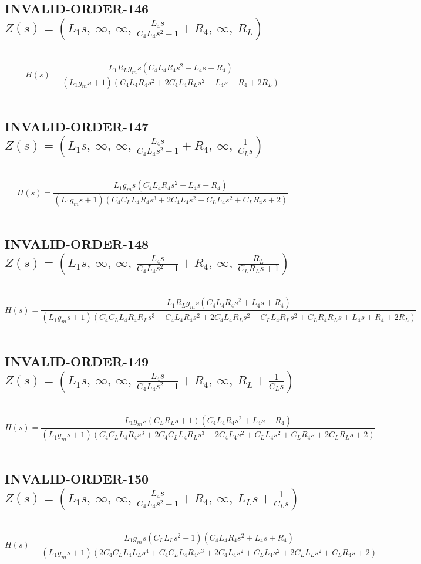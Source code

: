 \documentclass{article}
\begin{document}
\subsection{INVALID-ORDER-146 $Z(s) = \left( L_{1} s, \  \infty, \  \infty, \  \frac{L_{4} s}{C_{4} L_{4} s^{2} + 1} + R_{4}, \  \infty, \  R_{L}\right)$ } \ 
\textbf{\[H(s) = \frac{L_{1} R_{L} g_{m} s \left(C_{4} L_{4} R_{4} s^{2} + L_{4} s + R_{4}\right)}{\left(L_{1} g_{m} s + 1\right) \left(C_{4} L_{4} R_{4} s^{2} + 2 C_{4} L_{4} R_{L} s^{2} + L_{4} s + R_{4} + 2 R_{L}\right)}\] } \ 
\subsection{INVALID-ORDER-147 $Z(s) = \left( L_{1} s, \  \infty, \  \infty, \  \frac{L_{4} s}{C_{4} L_{4} s^{2} + 1} + R_{4}, \  \infty, \  \frac{1}{C_{L} s}\right)$ } \ 
\textbf{\[H(s) = \frac{L_{1} g_{m} s \left(C_{4} L_{4} R_{4} s^{2} + L_{4} s + R_{4}\right)}{\left(L_{1} g_{m} s + 1\right) \left(C_{4} C_{L} L_{4} R_{4} s^{3} + 2 C_{4} L_{4} s^{2} + C_{L} L_{4} s^{2} + C_{L} R_{4} s + 2\right)}\] } \ 
\subsection{INVALID-ORDER-148 $Z(s) = \left( L_{1} s, \  \infty, \  \infty, \  \frac{L_{4} s}{C_{4} L_{4} s^{2} + 1} + R_{4}, \  \infty, \  \frac{R_{L}}{C_{L} R_{L} s + 1}\right)$ } \ 
\textbf{\[H(s) = \frac{L_{1} R_{L} g_{m} s \left(C_{4} L_{4} R_{4} s^{2} + L_{4} s + R_{4}\right)}{\left(L_{1} g_{m} s + 1\right) \left(C_{4} C_{L} L_{4} R_{4} R_{L} s^{3} + C_{4} L_{4} R_{4} s^{2} + 2 C_{4} L_{4} R_{L} s^{2} + C_{L} L_{4} R_{L} s^{2} + C_{L} R_{4} R_{L} s + L_{4} s + R_{4} + 2 R_{L}\right)}\] } \ 
\subsection{INVALID-ORDER-149 $Z(s) = \left( L_{1} s, \  \infty, \  \infty, \  \frac{L_{4} s}{C_{4} L_{4} s^{2} + 1} + R_{4}, \  \infty, \  R_{L} + \frac{1}{C_{L} s}\right)$ } \ 
\textbf{\[H(s) = \frac{L_{1} g_{m} s \left(C_{L} R_{L} s + 1\right) \left(C_{4} L_{4} R_{4} s^{2} + L_{4} s + R_{4}\right)}{\left(L_{1} g_{m} s + 1\right) \left(C_{4} C_{L} L_{4} R_{4} s^{3} + 2 C_{4} C_{L} L_{4} R_{L} s^{3} + 2 C_{4} L_{4} s^{2} + C_{L} L_{4} s^{2} + C_{L} R_{4} s + 2 C_{L} R_{L} s + 2\right)}\] } \ 
\subsection{INVALID-ORDER-150 $Z(s) = \left( L_{1} s, \  \infty, \  \infty, \  \frac{L_{4} s}{C_{4} L_{4} s^{2} + 1} + R_{4}, \  \infty, \  L_{L} s + \frac{1}{C_{L} s}\right)$ } \ 
\textbf{\[H(s) = \frac{L_{1} g_{m} s \left(C_{L} L_{L} s^{2} + 1\right) \left(C_{4} L_{4} R_{4} s^{2} + L_{4} s + R_{4}\right)}{\left(L_{1} g_{m} s + 1\right) \left(2 C_{4} C_{L} L_{4} L_{L} s^{4} + C_{4} C_{L} L_{4} R_{4} s^{3} + 2 C_{4} L_{4} s^{2} + C_{L} L_{4} s^{2} + 2 C_{L} L_{L} s^{2} + C_{L} R_{4} s + 2\right)}\] } \ 
\end{document}
